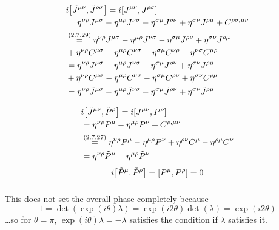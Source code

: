 \subsubsection{ }
\begin{align*}
	&i\commutator{\tilde{J}^{\mu\nu}}{\tilde{J}^{\rho\sigma}}=i\commutator{J^{\mu\nu}}{J^{\rho\sigma}}\\
	&=\eta^{\nu\rho}J^{\mu\sigma}-\eta^{\mu\rho}J^{\nu\sigma}-\eta^{\sigma\mu}J^{\rho\nu}+\eta^{\sigma\nu}J^{\rho\mu}+C^{\rho\sigma,\mu\nu}\\
	&\overset{\eqc{2.7.29}}{=}\eta^{\nu\rho}J^{\mu\sigma}-\eta^{\mu\rho}J^{\nu\sigma}-\eta^{\sigma\mu}J^{\rho\nu}+\eta^{\sigma\nu}J^{\rho\mu}\\
	&+\eta^{\nu\rho}C^{\mu\sigma}-\eta^{\mu\rho}C^{\nu\sigma}+\eta^{\sigma\mu}C^{\nu\rho}-\eta^{\nu\sigma}C^{\mu\rho}\\
	&=\eta^{\nu\rho}J^{\mu\sigma}-\eta^{\mu\rho}J^{\nu\sigma}-\eta^{\sigma\mu}J^{\rho\nu}+\eta^{\sigma\nu}J^{\rho\mu}\\
	&+\eta^{\nu\rho}C^{\mu\sigma}-\eta^{\mu\rho}C^{\nu\sigma}-\eta^{\sigma\mu}C^{\rho\nu}+\eta^{\sigma\nu}C^{\rho\mu}\\
	&=\eta^{\nu\rho}\tilde{J}^{\mu\sigma}-\eta^{\mu\rho}\tilde{J}^{\nu\sigma}-\eta^{\sigma\mu}\tilde{J}^{\rho\nu}+\eta^{\sigma\nu}\tilde{J}^{\rho\mu}
\end{align*}

\begin{align*}
	&i\commutator{\tilde{J}^{\mu\nu}}{\tilde{P}^\rho}=i\commutator{J^{\mu\nu}}{P^\rho}\\
	&=\eta^{\nu\rho}P^\mu-\eta^{\mu\rho}P^\nu + C^{\rho,\mu\nu}\\
	&\overset{\eqc{2.7.27}}{=}\eta^{\nu\rho}P^\mu-\eta^{\mu\rho}P^\nu+\eta^{\rho\nu}C^\mu
	-\eta^{\rho\mu}C^\nu\\
	&=\eta^{\nu\rho}\tilde{P}^\mu-\eta^{\mu\rho}\tilde{P}^\nu
\end{align*}
\begin{align*}
	i\commutator{\tilde{P}^\mu}{\tilde{P}^\rho}=\commutator{P^\mu}{P^\rho}=0
\end{align*}

\subsubsection{ }
This does not set the overall phase completely because 
\[1=\det(\exp(i\theta)\lambda)=\exp(i2\theta)\det(\lambda)=\exp(i2\theta)\]
\dots so for $\theta=\pi$, $\exp(i\theta)\lambda=-\lambda$ satisfies the condition if $\lambda$ satisfies it. 

